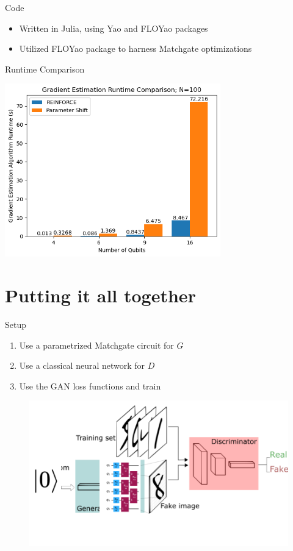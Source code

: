 \documentclass[xcolor=dvipsnames]{beamer}
\begin{document}
\begin{frame}{Code}
  \begin{itemize}
    \item Written in Julia, using Yao and FLOYao packages
    \item Utilized FLOYao package to harness Matchgate optimizations
  \end{itemize}
\end{frame}

\begin{frame}{Runtime Comparison}
  \begin{center}
    \includegraphics[width=0.7\textwidth]{runtimecomparison.png}
  \end{center}
\end{frame}
\section{Putting it all together}

\begin{frame}{Setup}
  \begin{enumerate}
    \item Use a parametrized Matchgate circuit for $G$
    \item Use a classical neural network for $D$
    \item Use the GAN loss functions and train
  \end{enumerate}
  \begin{figure}
    \centering
    \includegraphics[width=0.7 \textwidth]{Untitled presentation (1).png}
  \end{figure}
\end{frame}
\end{document}
